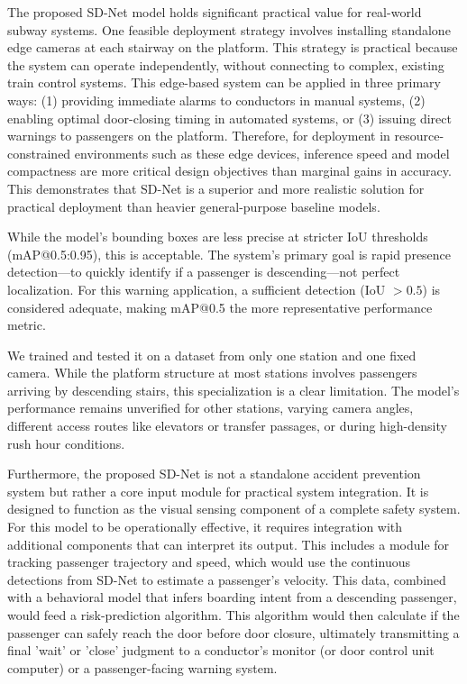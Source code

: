 \documentclass[journal,twoside,web]{ieeecolor}
\begin{document}
The proposed \ac{SD-Net} model holds significant practical value for real-world subway systems. One feasible deployment strategy involves installing standalone edge cameras at each stairway on the platform. This strategy is practical because the system can operate independently, without connecting to complex, existing train control systems. This edge-based system can be applied in three primary ways: (1) providing immediate alarms to conductors in manual systems, (2) enabling optimal door-closing timing in automated systems, or (3) issuing direct warnings to passengers on the platform. Therefore, for deployment in resource-constrained environments such as these edge devices, inference speed and model compactness are more critical design objectives than marginal gains in accuracy. This demonstrates that \ac{SD-Net} is a superior and more realistic solution for practical deployment than heavier general-purpose baseline models.


While the model's bounding boxes are less precise at stricter \ac{IoU} thresholds (\ac{mAP}@0.5:0.95), this is acceptable. 
The system's primary goal is rapid presence detection—to quickly identify if a passenger is descending—not perfect localization. For this warning application, a sufficient detection (\ac{IoU} $> 0.5$) is considered adequate, making \ac{mAP}@0.5 the more representative performance metric.

We trained and tested it on a dataset from only one station and one fixed camera. While the platform structure at most stations involves passengers arriving by descending stairs, this specialization is a clear limitation. The model's performance remains unverified for other stations, varying camera angles, different access routes like elevators or transfer passages, or during high-density rush hour conditions.

Furthermore, the proposed \ac{SD-Net} is not a standalone accident prevention system but rather a core input module for practical system integration. It is designed to function as the visual sensing component of a complete safety system. For this model to be operationally effective, it requires integration with additional components that can interpret its output. This includes a module for tracking passenger trajectory and speed, which would use the continuous detections from \ac{SD-Net} to estimate a passenger's velocity. This data, combined with a behavioral model that infers boarding intent from a descending passenger, would feed a risk-prediction algorithm. This algorithm would then calculate if the passenger can safely reach the door before door closure, ultimately transmitting a final 'wait' or 'close' judgment to a conductor's
monitor (or door control unit computer) or a passenger-facing warning system.
\end{document}
